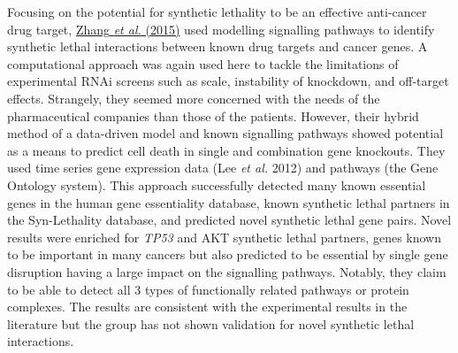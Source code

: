 Focusing on the potential for synthetic lethality to be an effective anti-cancer drug target, \hyperlink{ENREF117}{Zhang}\hyperlink{ENREF117}{\textit{ et al.}}\hyperlink{ENREF117}{ (2015)} used modelling signalling pathways to identify synthetic lethal interactions between known drug targets and cancer genes. A computational approach was again used here to tackle the limitations of experimental RNAi screens such as scale, instability of knockdown, and off-target effects. Strangely, they seemed more concerned with the needs of the pharmaceutical companies than those of the patients. However, their {\textquotesingle}hybrid{\textquotesingle} method of a data-driven model and known signalling pathways showed potential as a means to predict cell death in single and combination gene knockouts. They used time series gene expression data (Lee\textit{ et al.} 2012) and pathways (the Gene Ontology system). This approach successfully detected many known essential genes in the human gene essentiality database, known synthetic lethal partners in the Syn-Lethality database, and predicted novel synthetic lethal gene pairs. Novel results were enriched for \textit{TP53} and AKT synthetic lethal partners, genes known to be important in many cancers but also predicted to be essential by single gene disruption having a large impact on the signalling pathways. Notably, they claim to be able to detect all 3 types of functionally related pathways or protein complexes. The results are consistent with the experimental results in the literature but the group has not shown validation for novel synthetic lethal interactions.  

